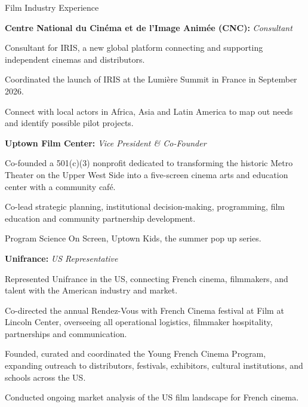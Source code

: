 \begin{rubric}{Film Industry Experience}

\entry*[2026]%
\textbf{Centre National du Cin\'ema et de l'Image Anim\'ee (CNC):} \textit{Consultant}
\par
\begin{cvitems}
  \item Consultant for IRIS, a new global platform connecting and supporting independent cinemas
  and distributors.
  \item Coordinated the launch of IRIS at the Lumi\`ere Summit in France in September 2026.
  \item Connect with local actors in Africa, Asia and Latin America to map out needs and
  identify possible pilot projects.
\end{cvitems}

\entry*[2024--present]%
\textbf{Uptown Film Center:} \textit{Vice President \& Co-Founder}
\par
\begin{cvitems}
  \item Co-founded a 501(c)(3) nonprofit dedicated to transforming the historic Metro Theater
  on the Upper West Side into a five-screen cinema arts and education center with a community
  caf\'e.
  \item Co-lead strategic planning, institutional decision-making, programming, film education
  and community partnership development.
  \item Program Science On Screen, Uptown Kids, the summer pop up series.
\end{cvitems}

\entry*[2013--2024]%
\textbf{Unifrance:} \textit{US Representative}
\par
\begin{cvitems}
  \item Represented Unifrance in the US, connecting French cinema, filmmakers, and talent with
  the American industry and market.
  \item Co-directed the annual Rendez-Vous with French Cinema festival at Film at Lincoln
  Center, overseeing all operational logistics, filmmaker hospitality, partnerships and
  communication.
  \item Founded, curated and coordinated the Young French Cinema Program, expanding outreach
  to distributors, festivals, exhibitors, cultural institutions, and schools across the US.
  \item Conducted ongoing market analysis of the US film landscape for French cinema.
\end{cvitems}


\end{rubric}
